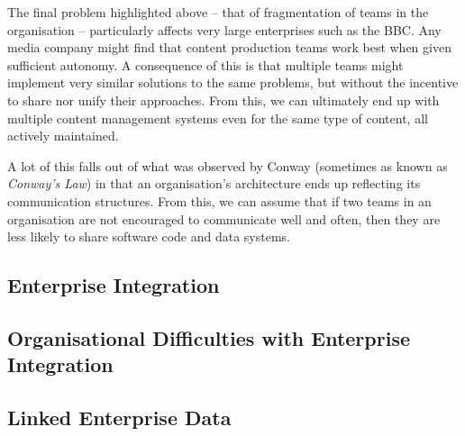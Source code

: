 The final problem highlighted above -- that of fragmentation of teams in the
organisation -- particularly affects very large enterprises such as the BBC.
Any media company might find that content production teams work best when
given sufficient autonomy. A consequence of this is that multiple teams
might implement very similar solutions to the same problems, but without the
incentive to share nor unify their approaches. From this, we can ultimately
end up with multiple content management systems even for the same type of
content, all actively maintained.

A lot of this falls out of what was observed by
Conway\cite{conway1968committees} (sometimes as known as \emph{Conway's Law})
in that an organisation's architecture ends up reflecting its communication
structures. From this, we can assume that if two teams in an organisation
are not encouraged to communicate well and often, then they are less likely to
share software code and data systems.

\subsection{Enterprise Integration}
\subsection{Organisational Difficulties with Enterprise Integration}
\label{sec:ei-difficulties}
\subsection{Linked Enterprise Data}

